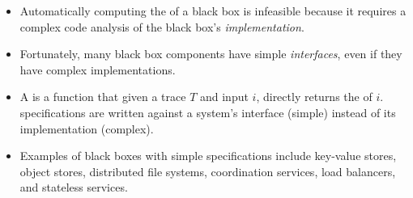 \begin{itemize}
  \item
    Automatically computing the \watprovenance{} of a black box is infeasible
    because it requires a complex code analysis of the black box's
    \emph{implementation}.
  \item
    Fortunately, many black box components have simple \emph{interfaces}, even
    if they have complex implementations.
  \item
    A  is a function that given a trace
    $T$ and input $i$, directly returns the \watprovenance{} of $i$.
    \Watprovenance{} specifications are written against a system's interface
    (simple) instead of its implementation (complex).
  \item
    Examples of black boxes with simple \watprovenance{} specifications include
    key-value stores, object stores, distributed file systems, coordination
    services, load balancers, and stateless services.
\end{itemize}
